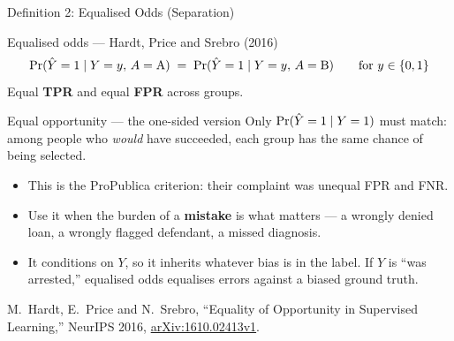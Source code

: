 
\begin{frame}[allowframebreaks]{Definition 2: Equalised Odds (Separation)}

    \begin{block}{Equalised odds --- Hardt, Price and Srebro (2016)}
        \[
            \Pr(\hat{Y} = 1 \mid Y = y,\, A = \text{A}) \;=\; \Pr(\hat{Y} = 1 \mid Y = y,\, A = \text{B})
            \qquad \text{for } y \in \{0,1\}
        \]
        Equal \textbf{TPR} and equal \textbf{FPR} across groups.
    \end{block}

    \vspace{0.5em}

    \begin{block}{Equal opportunity --- the one-sided version}
        Only $\Pr(\hat{Y} = 1 \mid Y = 1)$ must match: among people who \emph{would} have succeeded,
        each group has the same chance of being selected.
    \end{block}

    \vspace{0.6em}

    \begin{itemize}\small
        \setlength\itemsep{0.35em}
        \item This is the ProPublica criterion: their complaint was unequal FPR and FNR.
        \item Use it when the burden of a \textbf{mistake} is what matters --- a wrongly denied
              loan, a wrongly flagged defendant, a missed diagnosis.
        \item It conditions on $Y$, so it inherits whatever bias is in the label. If $Y$ is
              ``was arrested,'' equalised odds equalises errors against a biased ground truth.
    \end{itemize}

    \vspace{0.3em}
    {\scriptsize M.~Hardt, E.~Price and N.~Srebro, ``Equality of Opportunity in Supervised Learning,''
    NeurIPS 2016, \href{https://arxiv.org/abs/1610.02413v1}{arXiv:1610.02413v1}.}
\end{frame}
